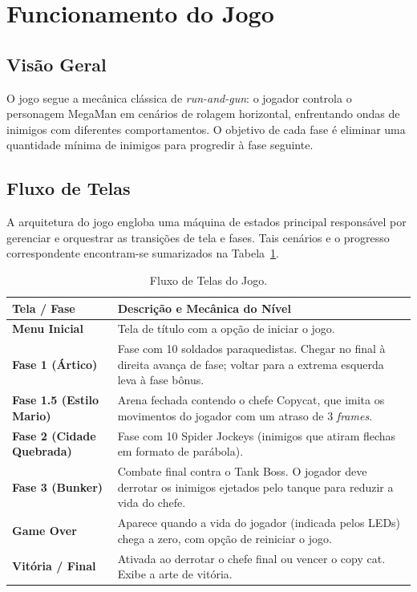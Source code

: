 \documentclass[10pt,twocolumn,letterpaper]{article}
\begin{document}
\section{Funcionamento do Jogo}

\subsection{Visão Geral}
O jogo segue a mecânica clássica de \textit{run-and-gun}: o jogador controla o personagem MegaMan em cenários de rolagem horizontal, enfrentando ondas de inimigos com diferentes comportamentos. O objetivo de cada fase é eliminar uma quantidade mínima de inimigos para progredir à fase seguinte.

\subsection{Fluxo de Telas}
A arquitetura do jogo engloba uma máquina de estados principal responsável por gerenciar e orquestrar as transições de tela e fases. Tais cenários e o progresso correspondente encontram-se sumarizados na Tabela~\ref{tab:telas}.

\begin{table}[H]
\centering
\caption{Fluxo de Telas do Jogo.}
\label{tab:telas}
\scriptsize
\begin{tabularx}{\columnwidth}{@{}lX@{}}
\toprule
\textbf{Tela / Fase} & \textbf{Descrição e Mecânica do Nível} \\ \midrule
\textbf{Menu Inicial} & Tela de título com a opção de iniciar o jogo. \\
\textbf{Fase 1 (Ártico)} & Fase com 10 soldados paraquedistas. Chegar no final à direita avança de fase; voltar para a extrema esquerda leva à fase bônus. \\
\textbf{Fase 1.5 (Estilo Mario)} & Arena fechada contendo o chefe Copycat, que imita os movimentos do jogador com um atraso de 3 \textit{frames}. \\
\textbf{Fase 2 (Cidade Quebrada)} & Fase com 10 Spider Jockeys (inimigos que atiram flechas em formato de parábola). \\
\textbf{Fase 3 (Bunker)} & Combate final contra o Tank Boss. O jogador deve derrotar os inimigos ejetados pelo tanque para reduzir a vida do chefe. \\
\textbf{Game Over} & Aparece quando a vida do jogador (indicada pelos LEDs) chega a zero, com opção de reiniciar o jogo. \\
\textbf{Vitória / Final} & Ativada ao derrotar o chefe final ou vencer o copy cat. Exibe a arte de vitória. \\ \bottomrule
\end{tabularx}
\end{table}
\end{document}
